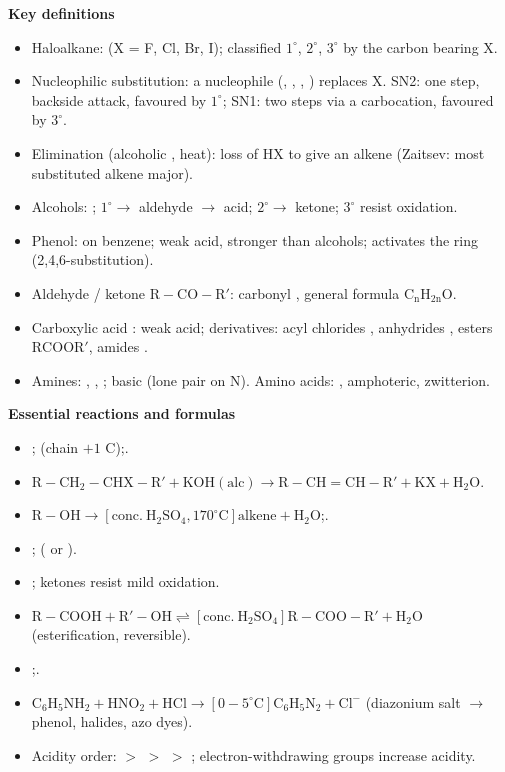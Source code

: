 \documentclass[11pt]{article}
\newcommand{\cle}[1]{{\popxbold\color{popdark}#1}}
\begin{document}
\begin{bilan}
\textbf{Key definitions}
\begin{itemize}
\item \cle{Haloalkane}:  (X = F, Cl, Br, I); classified $1^\circ$, $2^\circ$, $3^\circ$ by the carbon bearing X.
\item \cle{Nucleophilic substitution}: a nucleophile (, , , ) replaces X. \cle{SN2}: one step, backside attack, favoured by $1^\circ$; \cle{SN1}: two steps via a carbocation, favoured by $3^\circ$.
\item \cle{Elimination} (alcoholic , heat): loss of HX to give an alkene (Zaitsev: most substituted alkene major).
\item \cle{Alcohols}: ; $1^\circ \to$ aldehyde $\to$ acid; $2^\circ \to$ ketone; $3^\circ$ resist oxidation.
\item \cle{Phenol}:  on benzene; weak acid, stronger than alcohols; activates the ring (2,4,6-substitution).
\item \cle{Aldehyde}  / \cle{ketone} \ensuremath{\mathrm{R-CO-R'}}: carbonyl , general formula \ensuremath{\mathrm{C_nH_{2n}O}}.
\item \cle{Carboxylic acid} : weak acid; derivatives: acyl chlorides , anhydrides , esters \ensuremath{\mathrm{RCOOR'}}, amides .
\item \cle{Amines}: , , ; basic (lone pair on N). \cle{Amino acids}: , amphoteric, zwitterion.
\end{itemize}

\textbf{Essential reactions and formulas}
\begin{itemize}
\item {};\quad {} (chain $+1$ C);\quad {}.
\item \ensuremath{\mathrm{R-CH_{2}-CHX-R' + KOH(alc) \rightarrow  R-CH=CH-R' + KX + H_{2}O}}.
\item \ensuremath{\mathrm{R-OH \rightarrow [conc.\ H_{2}SO_{4}, 170^\circ C] alkene + H_{2}O}};\quad {}.
\item {};\quad {} ( or ).
\item {}; ketones resist mild oxidation.
\item \ensuremath{\mathrm{R-COOH + R'-OH \rightleftharpoons [conc.\ H_{2}SO_{4}] R-COO-R' + H_{2}O}} (esterification, reversible).
\item {};\quad {}.
\item \ensuremath{\mathrm{C_{6}H_{5}NH_{2} + HNO_{2} + HCl \rightarrow [0-5^\circ C] C_{6}H_{5}N_{2}+Cl^{-}}} (diazonium salt $\to$ phenol, halides, azo dyes).
\item Acidity order:  $>$  $>$  $>$ ; electron-withdrawing groups increase acidity.
\end{itemize}


\end{bilan}
\end{document}
